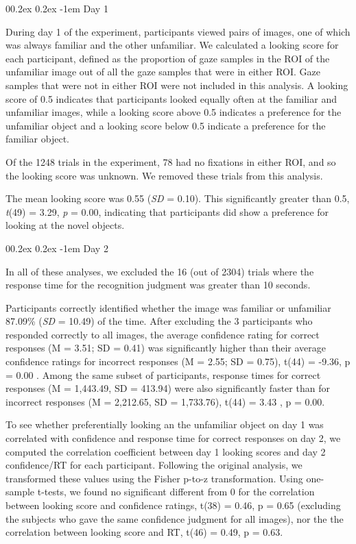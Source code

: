 \documentclass[
  man,floatsintext]{apa6}
\makeatletter
\let\oldparagraph\paragraph
\renewcommand{\paragraph}[1]{\oldparagraph{#1}\mbox{}}
\renewcommand{\paragraph}{\@startsection{paragraph}{4}{\parindent}%
  {0\baselineskip \@plus 0.2ex \@minus 0.2ex}%
  {-1em}%
  {\normalfont\normalsize\bfseries\itshape\typesectitle}}
\makeatother
\begin{document}
\hypertarget{day-1}{%
\paragraph{Day 1}\label{day-1}}

During day 1 of the experiment, participants viewed pairs of images, one of which was always familiar and the other unfamiliar. We calculated a looking score for each participant, defined as the proportion of gaze samples in the ROI of the unfamiliar image out of all the gaze samples that were in either ROI. Gaze samples that were not in either ROI were not included in this analysis. A looking score of 0.5 indicates that participants looked equally often at the familiar and unfamiliar images, while a looking score above 0.5 indicates a preference for the unfamiliar object and a looking score below 0.5 indicate a preference for the familiar object.

Of the 1248 trials in the experiment, 78 had no fixations in either ROI, and so the looking score was unknown. We removed these trials from this analysis.

The mean looking score was 0.55 (\emph{SD} = 0.10). This significantly greater than 0.5, \emph{t}(49) = 3.29, \emph{p} = 0.00, indicating that participants did show a preference for looking at the novel objects.

\hypertarget{day-2}{%
\paragraph{Day 2}\label{day-2}}

In all of these analyses, we excluded the 16 (out of 2304) trials where the response time for the recognition judgment was greater than 10 seconds.

Participants correctly identified whether the image was familiar or unfamiliar 87.09\% (\emph{SD} = 10.49) of the time. After excluding the 3 participants who responded correctly to all images, the average confidence rating for correct responses (M = 3.51; SD = 0.41) was significantly higher than their average confidence ratings for incorrect responses (M = 2.55; SD = 0.75), t(44) = -9.36, p = 0.00 . Among the same subset of participants, response times for correct responses (M = 1,443.49, SD = 413.94) were also significantly faster than for incorrect responses (M = 2,212.65, SD = 1,733.76), t(44) = 3.43 , p = 0.00.

To see whether preferentially looking an the unfamiliar object on day 1 was correlated with confidence and response time for correct responses on day 2, we computed the correlation coefficient between day 1 looking scores and day 2 confidence/RT for each participant. Following the original analysis, we transformed these values using the Fisher p-to-z transformation. Using one-sample t-tests, we found no significant different from 0 for the correlation between looking score and confidence ratings, t(38) = 0.46, p = 0.65 (excluding the subjects who gave the same confidence judgment for all images), nor the the correlation between looking score and RT, t(46) = 0.49, p = 0.63.
\end{document}
